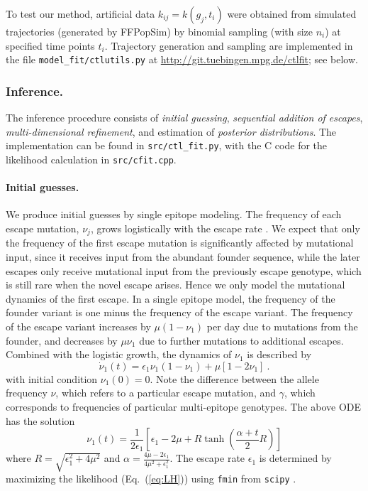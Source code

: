 \documentclass{frontiers}
\newcommand{\EQ}[1]{Eq.~(\ref{eq:#1})}
\newcommand{\gt}{g}
\newcommand{\gtfreq}{\gamma}
\newcommand{\afreq}{\nu}
\newcommand{\fcoeff}{\epsilon}
\begin{document}
To test our method,
artificial data $k_{ij} = k(\gt_j,t_i)$ were obtained from simulated
trajectories (generated by FFPopSim) by binomial sampling (with size $n_{i}$) at specified
time points $t_i$. Trajectory generation and sampling are implemented in the file
\texttt{model\_fit/ctlutils.py} at \url{http://git.tuebingen.mpg.de/ctlfit}; see below.


\subsubsection{Inference.} 
The inference procedure consists of \emph{initial guessing}, \emph{sequential
addition of escapes}, \emph{multi-dimensional refinement}, and estimation of
\emph{posterior distributions}. The implementation can be found in
\texttt{src/ctl\_fit.py}, with the C code for the likelihood calculation in
\texttt{src/cfit.cpp}.

\paragraph*{Initial guesses. } We produce initial guesses by single epitope
modeling. The frequency of each escape mutation, $\afreq_j$, grows logistically
with the escape rate \citep{ganusov_mathematical_2013}. We expect that only the frequency of the 
first escape mutation is significantly affected by mutational input, since it 
receives input from the abundant founder sequence, while the later escapes only 
receive mutational input from the previously escape genotype, which is still rare 
when the novel escape arises. Hence we only model the mutational dynamics of the
first escape. In a single epitope model, the frequency of the founder variant 
is one minus the frequency of the escape variant. The frequency of the escape variant
increases by $\mu (1-\nu_1)$ per day due to mutations from the founder, and decreases
by $\mu\nu_1$ due to further mutations to additional escapes. Combined with 
the logistic growth, the dynamics of  $\afreq_1$ is described by
\begin{equation}
\dot \afreq_1(t) = \fcoeff_1\afreq_1(1-\afreq_1) +\mu [1-2\afreq_1] \ .
\end{equation}
with initial condition $\afreq_1(0)=0$.
Note the difference between the allele frequency $\afreq$, which refers to a
particular escape mutation, and $\gtfreq$, which corresponds to frequencies of particular
multi-epitope genotypes. The above ODE has the solution
\begin{equation}
\afreq_1(t) = \frac{1}{2\epsilon_1}[\fcoeff_1-2\mu+R\tanh (\frac{\alpha+t}{2}R)]
\end{equation}
where $R = \sqrt{\fcoeff_1^2 + 4\mu^2}$ and $\alpha =
\frac{4\mu-2\fcoeff_1}{4\mu^2+\fcoeff_1^2}$\citep{ganusov_mathematical_2013}. 
The escape rate $\fcoeff_1$ is
determined by maximizing the likelihood (\EQ{LH}) using \texttt{fmin} from
\texttt{scipy} \citep{Oliphant:2007p25672}. 
\end{document}
